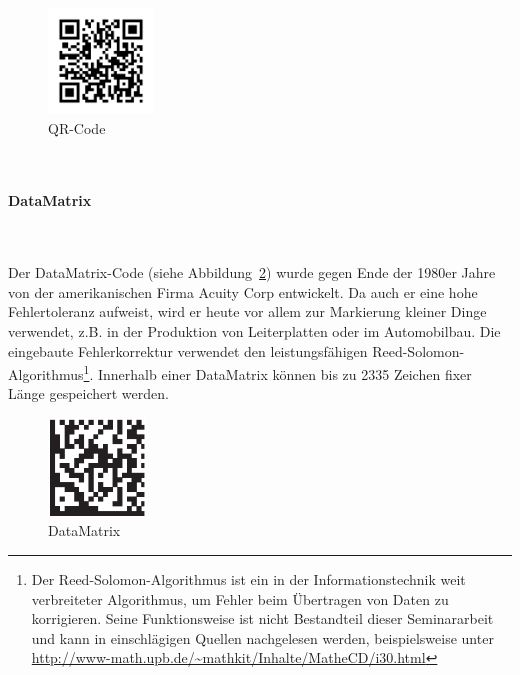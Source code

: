 \begin{figure}[htbp]%
	\centering
	\includegraphics[width=0.25\textwidth]{Bilder/QR_Code.png}
	\caption[QR-Code]{QR-Code\footnotemark}
	\label{fig:qrcode}	
\end{figure}~\\
\pagebreak
\paragraph{DataMatrix}~

Der DataMatrix-Code (siehe Abbildung~\ref{fig:datamatrix}) wurde gegen Ende der 1980er Jahre von der amerikanischen Firma Acuity Corp entwickelt. Da auch er eine hohe Fehlertoleranz aufweist, wird er heute vor allem zur Markierung kleiner Dinge verwendet, z.B. in der Produktion von Leiterplatten oder im Automobilbau. Die eingebaute Fehlerkorrektur verwendet den leistungsfähigen Reed-Solomon-Algorithmus\footnote{Der Reed-Solomon-Algorithmus ist ein in der Informationstechnik weit verbreiteter Algorithmus, um Fehler beim Übertragen von Daten zu korrigieren. Seine Funktionsweise ist nicht Bestandteil dieser Seminararbeit und kann in einschlägigen Quellen nachgelesen werden, beispielsweise unter \url{http://www-math.upb.de/~mathkit/Inhalte/MatheCD/i30.html}}. Innerhalb einer DataMatrix können bis zu 2335 Zeichen fixer Länge gespeichert werden.

\begin{figure}[htbp]%
	\centering
	\includegraphics[width=0.23\textwidth]{Bilder/DataMatrix.png} 
	\caption[DataMatrix]{DataMatrix\footnotemark}
	\label{fig:datamatrix}	
\end{figure}

